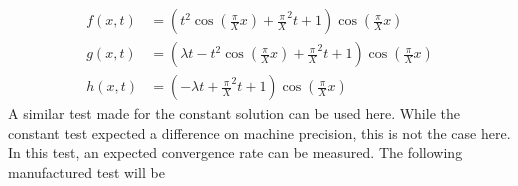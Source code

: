 \documentclass[%
twoside,                 %
final,                   %
10pt]{article}
\begin{document}
\begin{equation} \label{eq:manu_func}
	\begin{aligned}
	f(x,t) &= (t^2\cos(\frac{\pi}{X} x) + \frac{\pi}{X}^2t + 1)\cos(\frac{\pi}{X} x)\\
	g(x,t) &= (\lambda t - t^2\cos(\frac{\pi}{X} x) + \frac{\pi}{X}^2t + 1)\cos(\frac{\pi}{X} x)\\
	h(x,t) &= (-\lambda t + \frac{\pi}{X}^2t + 1)\cos(\frac{\pi}{X} x)
	\end{aligned}
\end{equation}
A similar test made for the constant solution can be used here. While the constant test expected a difference on machine precision, this is not the case here. In this test, an expected convergence rate can be measured. The following manufactured test will be
\end{document}
